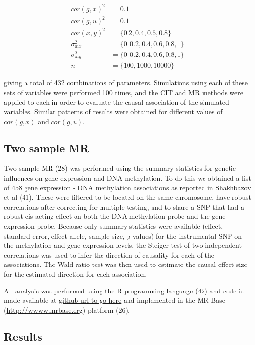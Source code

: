 \documentclass[]{article}
\begin{document}
\[
\begin{aligned}
cor(g, x)^2 & = 0.1 \\
cor(g, u)^2 & = 0.1 \\
cor(x, y)^2 & = \{0.2, 0.4, 0.6, 0.8\} \\
\sigma^2_{mx} & = \{0, 0.2, 0.4, 0.6, 0.8, 1\} \\
\sigma^2_{my} & = \{0, 0.2, 0.4, 0.6, 0.8, 1\} \\
n & = \{100, 1000, 10000\}
\end{aligned}
\]

giving a total of 432 combinations of parameters. Simulations using each
of these sets of variables were performed 100 times, and the CIT and MR
methods were applied to each in order to evaluate the causal association
of the simulated variables. Similar patterns of results were obtained
for different values of \(cor(g, x)\) and \(cor(g, u)\).

\subsection{Two sample MR}\label{two-sample-mr}

Two sample MR (28) was performed using the summary statistics for
genetic influences on gene expression and DNA methylation. To do this we
obtained a list of 458 gene expression - DNA methylation associations as
reported in Shakhbazov et al (41). These were filtered to be located on
the same chromosome, have robust correlations after correcting for
multiple testing, and to share a SNP that had a robust cis-acting effect
on both the DNA methylation probe and the gene expression probe. Because
only summary statistics were available (effect, standard error, effect
allele, sample size, p-values) for the instrumental SNP on the
methylation and gene expression levels, the Steiger test of two
independent correlations was used to infer the direction of causality
for each of the associations. The Wald ratio test was then used to
estimate the causal effect size for the estimated direction for each
association.

All analysis was performed using the R programming language (42) and
code is made available at \href{}{github url to go here} and implemented
in the MR-Base (\url{http://wwww.mrbase.org}) platform (26).

\subsection{Results}\label{results}
\end{document}
